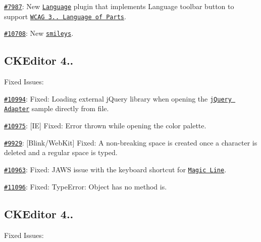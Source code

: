 {\begin{DoxyItemize}
\item \href{https://dev.ckeditor.com/ticket/7987}{\tt \#7987}\+: New \href{http://ckeditor.com/addon/language}{\tt Language} plugin that implements Language toolbar button to support \href{http://www.w3.org/TR/UNDERSTANDING-WCAG20/meaning-other-lang-id.html}{\tt W\+C\+AG 3.. Language of Parts}.
\item \href{http://dev.ckeditor.com/ticket/10708}{\tt \#10708}\+: New \href{http://ckeditor.com/addon/smiley}{\tt smileys}.
\end{DoxyItemize}}

{\ttfamily \subsection*{C\+K\+Editor 4..}}

{\ttfamily }

{\ttfamily Fixed Issues\+:}

{\ttfamily 
\begin{DoxyItemize}
\item \href{http://dev.ckeditor.com/ticket/10994}{\tt \#10994}\+: Fixed\+: Loading external j\+Query library when opening the \href{http://docs.ckeditor.com/#!/guide/dev_jquery}{\tt j\+Query Adapter} sample directly from file.
\item \href{http://dev.ckeditor.com/ticket/10975}{\tt \#10975}\+: \mbox{[}IE\mbox{]} Fixed\+: Error thrown while opening the color palette.
\item \href{http://dev.ckeditor.com/ticket/9929}{\tt \#9929}\+: \mbox{[}Blink/\+Web\+Kit\mbox{]} Fixed\+: A non-\/breaking space is created once a character is deleted and a regular space is typed.
\item \href{http://dev.ckeditor.com/ticket/10963}{\tt \#10963}\+: Fixed\+: J\+A\+WS issue with the keyboard shortcut for \href{http://ckeditor.com/addon/magicline}{\tt Magic Line}.
\item \href{http://dev.ckeditor.com/ticket/11096}{\tt \#11096}\+: Fixed\+: Type\+Error\+: Object has no method \textquotesingle{}is\textquotesingle{}.
\end{DoxyItemize}}

{\ttfamily \subsection*{C\+K\+Editor 4..}}

{\ttfamily }

{\ttfamily Fixed Issues\+:}

